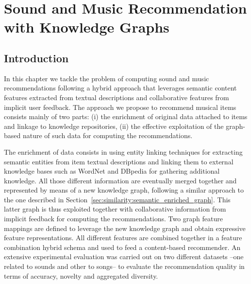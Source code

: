 
\chapter{Sound and Music Recommendation with Knowledge Graphs}
\label{sec:graph-rec}

\section{Introduction}
\label{sec:graph-rec:introduction}

In this chapter we tackle the problem of computing sound and music recommendations following a hybrid approach that leverages semantic content features extracted from textual descriptions and collaborative features from implicit user feedback. 
The approach we propose to recommend musical items consists mainly of two parts: (i) the enrichment of original data attached to items and linkage to knowledge repositories, (ii) the effective exploitation of the graph-based nature of such data for computing the recommendations. 

The enrichment of data consists in using entity linking techniques for extracting semantic entities from item textual descriptions and linking them to external knowledge bases such as WordNet \citep{wordnet} and DBpedia \citep{dbpedia1} for gathering additional knowledge. All those different information are eventually merged together and represented by means of a new knowledge graph, following a similar approach to the one described in Section~\ref{sec:similarity:semantic_enriched_graph}.
This latter graph is thus exploited together with collaborative information from implicit feedback for computing the recommendations. Two graph feature mappings are defined to leverage the new knowledge graph and obtain expressive feature representations. All different features are combined together in a feature combination hybrid schema \citep{Burke2002} and used to feed a content-based recommender. An extensive experimental evaluation was carried out on two different datasets --one related to sounds and other to songs-- to evaluate the recommendation quality in terms of accuracy, novelty and aggregated diversity. 

